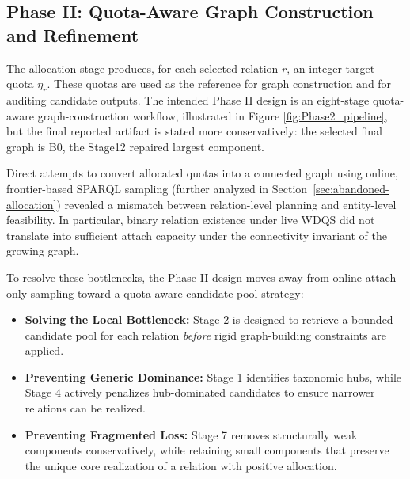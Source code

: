 \documentclass[12pt,a4paper]{article}
\begin{document}
\subsection{Phase II: Quota-Aware Graph Construction and Refinement}

The allocation stage produces, for each selected relation \(r\), an integer target quota \(\eta_r\). These quotas are used as the reference for graph construction and for auditing candidate outputs. The intended Phase II design is an eight-stage quota-aware graph-construction workflow, illustrated in Figure \ref{fig:Phase2_pipeline}, but the final reported artifact is stated more conservatively: the selected final graph is B0, the Stage12 repaired largest component.

Direct attempts to convert allocated quotas into a connected graph using online, frontier-based SPARQL sampling (further analyzed in Section~\ref{sec:abandoned-allocation}) revealed a mismatch between relation-level planning and entity-level feasibility. In particular, binary relation existence under live WDQS did not translate into sufficient attach capacity under the connectivity invariant of the growing graph.

To resolve these bottlenecks, the Phase II design moves away from online attach-only sampling toward a quota-aware candidate-pool strategy:
\begin{itemize}
    \item \textbf{Solving the Local Bottleneck:} Stage 2 is designed to retrieve a bounded candidate pool for each relation \emph{before} rigid graph-building constraints are applied.
    \item \textbf{Preventing Generic Dominance:} Stage 1 identifies taxonomic hubs, while Stage 4 actively penalizes hub-dominated candidates to ensure narrower relations can be realized.
    \item \textbf{Preventing Fragmented Loss:} Stage 7 removes structurally weak components conservatively, while retaining small components that preserve the unique core realization of a relation with positive allocation.
\end{itemize}
\end{document}
